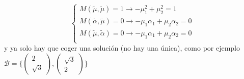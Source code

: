 \begin{problem}[7]
$$\begin{cases}
	M(\tilde{\mu},\tilde{\mu})=1\longrightarrow-\mu_1^2+\mu_2^2=1\\
	M(\tilde{\alpha},\tilde{\mu})=0\longrightarrow-\mu_1\alpha_1+\mu_2\alpha_2=0\\
	M(\tilde{\mu},\tilde{\alpha})=0\longrightarrow-\mu_1\alpha_1+\mu_2\alpha_2=0\\
	\end{cases}$$
	y ya solo hay que coger una solución (no hay una única), como por ejemplo $\mathcal{B}=\{\begin{pmatrix}2\\\sqrt{3}\end{pmatrix},\begin{pmatrix}\sqrt{3}\\2\end{pmatrix}\}$
\end{problem}
